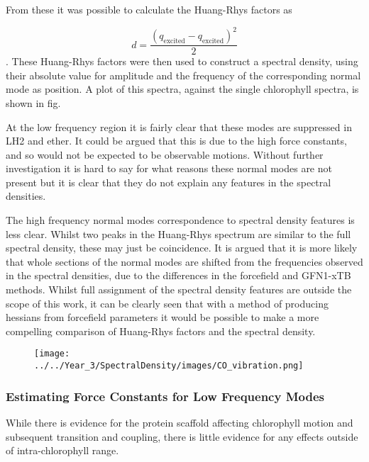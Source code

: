 From these it was possible to calculate the Huang-Rhys factors as

\begin{equation}
    d = \frac{\left(q_{\text{excited}} - q_{\text{excited}}\right)^2}{2}
\end{equation}
%
. These Huang-Rhys factors were then used to construct a spectral density, using
their absolute value for amplitude and the frequency of the corresponding normal
mode as position. A plot of this spectra, against the single chlorophyll spectra,
is shown in fig.

At the low frequency region it is fairly clear that these modes are suppressed in
LH2 and ether. It could be argued that this is due to the high force constants, 
and so would not be expected to be observable motions. Without further investigation
it is hard to say for what reasons these normal modes are not present but it is 
clear that they do not explain any features in the spectral densities.

The high frequency normal modes correspondence to spectral density features is less
clear. Whilst two peaks in the Huang-Rhys spectrum are similar to the full spectral
density, these may just be coincidence. It is argued that it is more likely that 
whole sections of the normal modes are shifted from the frequencies observed in
the spectral densities, due to the differences in the forcefield and GFN1-xTB methods.
Whilst full assignment of the spectral density features are outside the scope of 
this work, it can be clearly seen that with a method of producing hessians from 
forcefield parameters it would be possible to make a more compelling comparison
of Huang-Rhys factors and the spectral density.

\begin{figure}
    \texttt{[image: ../../Year\_3/SpectralDensity/images/CO\_vibration.png]}
\end{figure}

\subsubsection{Estimating Force Constants for Low Frequency Modes}
\label{subsubsec:force_constants}

While there is evidence for the protein scaffold affecting chlorophyll motion and
subsequent \Qy transition and coupling, there is little evidence for any effects
outside of intra-chlorophyll range. 


